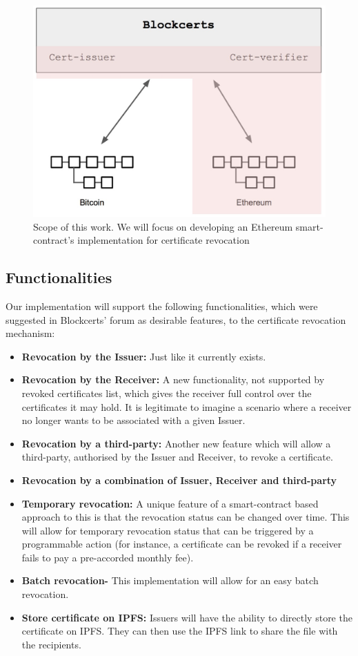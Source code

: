 \documentclass[llncsdoc]{llncs}
\begin{document}
\begin{figure}[t!]
  \includegraphics[width=\linewidth]{figures/arch.jpg}
  \caption{Scope of this work. We will focus on developing an Ethereum smart-contract's implementation for certificate revocation}
  \label{fig:scope}
\end{figure}
\subsection{Functionalities}
Our implementation will support the following functionalities, which were suggested in  Blockcerts' forum as desirable features, to the certificate revocation mechanism:
\begin{itemize}
    \item \textbf{Revocation by the Issuer:} Just like it currently exists.
    \item \textbf{Revocation by the Receiver:} A new functionality, not supported by revoked certificates list, which gives the receiver full control over the certificates it may hold. It is legitimate to imagine a scenario where a receiver no longer wants to be associated with a given Issuer.
    \item \textbf{Revocation by a third-party:} Another new feature which will allow a third-party, authorised by the Issuer and Receiver, to revoke a certificate.
    \item \textbf{Revocation by a combination of Issuer, Receiver and third-party}
    \item \textbf{Temporary revocation:} A unique feature of a smart-contract based approach to this is that the revocation status can be changed over time. This will allow for temporary revocation status that can be triggered by a programmable action (for instance, a certificate can be revoked if a receiver fails to pay a pre-accorded monthly fee).
    \item \textbf{Batch revocation-} This implementation will allow for an easy batch revocation.
    \item \textbf{Store certificate on IPFS:} Issuers will have the ability to directly store the certificate on IPFS. They can then use the IPFS link to share the file with the recipients.
\end{itemize}
\end{document}
